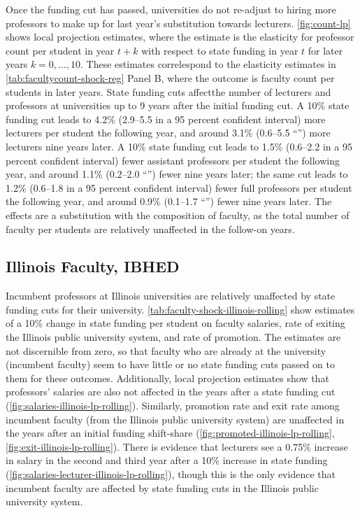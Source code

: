 Once the funding cut has passed, universities do not re-adjust to hiring more professors to make up for last year's substitution towards lecturers.
\autoref{fig:count-lp} shows local projection estimates, where the estimate is the elasticity for professor count per student in year $t+k$ with respect to state funding in year $t$ for later years $k = 0, \hdots, 10$.
These estimates correlespond to the elasticity estimates in \autoref{tab:facultycount-shock-reg} Panel B, where the outcome is faculty count per students in later years.
State funding cuts affectthe number of lecturers and professors at universities up to 9 years after the initial funding cut.
A 10\% state funding cut leads to 4.2\% (2.9--5.5 in a 95 percent confident interval) more lecturers per student the following year, and around 3.1\% (0.6--5.5 ``'') more lecturers nine years later.
A 10\% state funding cut leads to 1.5\% (0.6--2.2 in a 95 percent confident interval) fewer assistant professors per student the following year, and around 1.1\% (0.2--2.0 ``'') fewer nine years later;
the same cut leads to 1.2\% (0.6--1.8 in a 95 percent confident interval) fewer full professors per student the following year, and around 0.9\% (0.1--1.7 ``'') fewer nine years later.
The effects are a substitution with the composition of faculty, as the total number of faculty per students are relatively unaffected in the follow-on years.

\subsection{Illinois Faculty, IBHED}
Incumbent professors at Illinois universities are relatively unaffected by state funding cuts for their university.
\autoref{tab:faculty-shock-illinois-rolling} show estimates of a 10\% change in state funding per student on faculty salaries, rate of exiting the Illinois public university system, and rate of promotion.
The estimates are not discernible from zero, so that faculty who are already at the university (incumbent faculty) seem to have little or no state funding cuts passed on to them for these outcomes.
Additionally, local projection estimates show that professors' salaries are also not affected in the years after a state funding cut (\autoref{fig:salaries-illinois-lp-rolling}).
Similarly, promotion rate and exit rate among incumbent faculty (from the Illinois public university system) are unaffected in the years after an initial funding shift-share (\autoref{fig:promoted-illinois-lp-rolling}, \ref{fig:exit-illinois-lp-rolling}).
There is evidence that lecturers see a 0.75\% increase in salary in the second and third year after a 10\% increase in state funding (\autoref{fig:salaries-lecturer-illinois-lp-rolling}), though this is the only evidence that incumbent faculty are affected by state funding cuts in the Illinois public university system.


